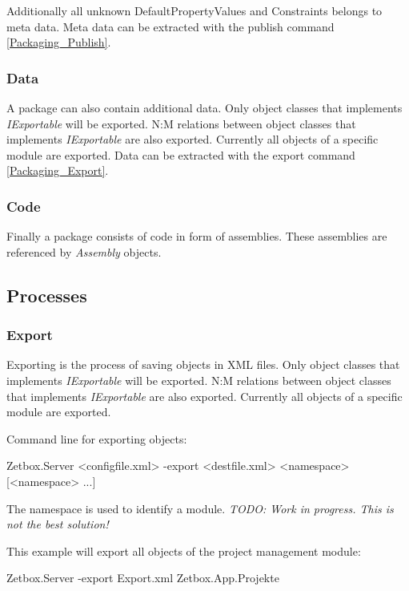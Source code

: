 Additionally all unknown DefaultPropertyValues and Constraints belongs to meta data.
Meta data can be extracted with the publish command \ref{Packaging_Publish}.

\subsubsection{\label{Packaging_Data}Data}

A package can also contain additional data. Only object classes that implements \emph{IExportable} will be exported. 
N:M relations between object classes that implements \emph{IExportable} are also exported. 
Currently all objects of a specific module are exported.
Data can be extracted with the export command \ref{Packaging_Export}.

\subsubsection{\label{Packaging_Code}Code}

Finally a package consists of code in form of assemblies. These assemblies are referenced by \emph{Assembly} objects.

\subsection{\label{Packaging_Processes}Processes}

\subsubsection{\label{Packaging_Export}Export}

Exporting is the process of saving objects in XML files. Only object classes that implements \emph{IExportable} will be exported. 
N:M relations between object classes that implements \emph{IExportable} are also exported. 
Currently all objects of a specific module are exported.

Command line for exporting objects:
\begin{CS}
Zetbox.Server <configfile.xml> -export <destfile.xml> <namespace> [<namespace> ...]
\end{CS}

The namespace is used to identify a module. \emph{TODO: Work in progress. This is not the best solution!}
\par

This example will export all objects of the project management module:
\begin{CS}
Zetbox.Server -export Export.xml Zetbox.App.Projekte
\end{CS}

